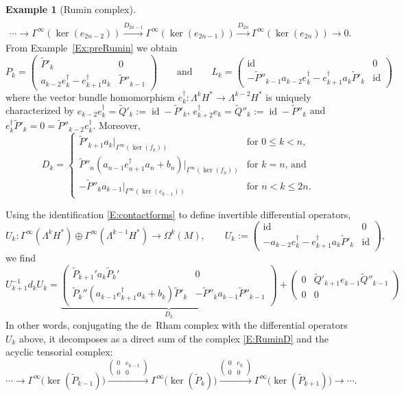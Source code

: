 \documentclass[reqno,12pt]{amsart}
\DeclareMathOperator{\id}{id}
\theoremstyle{plain}
\theoremstyle{definition}
\newtheorem{example}[theorem]{Example}
\begin{document}
\begin{example}[Rumin complex]
\begin{multline}
\\
\cdots\to\Gamma^\infty(\ker(e_{2n-2}))\xrightarrow{D_{2n-1}}
\Gamma^\infty(\ker(e_{2n-1}))\xrightarrow{D_{2n}}
\Gamma^\infty(\ker(e_{2n}))\to0.
\end{multline}
From Example~\ref{Ex:preRumin} we obtain
$$
P_k=\begin{pmatrix}\tilde P'_k&0\\a_{k-2}e^\dag_k-e^\dag_{k+1}a_k&\tilde P''_{k-1}\end{pmatrix}\qquad\text{and}\qquad
L_k=\begin{pmatrix}\id&0\\-\tilde P''_{k-1}a_{k-2}e^\dag_k-e^\dag_{k+1}a_k\tilde P'_k&\id\end{pmatrix}
$$
where the vector bundle homomorphism $e_k^\dag\colon\Lambda^kH^*\to\Lambda^{k-2}H^*$ is uniquely characterized by $e_{k-2}e^\dag_k=\tilde Q'_k:=\id-\tilde P'_k$, $e^\dag_{k+2}e_k=\tilde Q''_k:=\id-\tilde P''_k$ and $e^\dag_k\tilde P'_k=0=\tilde P''_{k-2}e^\dag_k$.
Moreover,
\begin{equation}\label{E:RuminDD}
D_k=\begin{cases}
\tilde P'_{k+1}a_k|_{\Gamma^\infty(\ker(f_k))}&\text{for $0\leq k<n$,}
\\
\tilde P''_n(a_{n-1}e^\dag_{n+1}a_n+b_n)|_{\Gamma^\infty(\ker(f_n))}&\text{for $k=n$, and}
\\
-\tilde P''_ka_{k-1}|_{\Gamma^\infty(\ker(e_{k-1}))}&\text{for $n<k\leq2n$.}
\end{cases}
\end{equation}

Using the identification \eqref{E:contactforms} to define invertible differential operators, 
$$
U_k\colon\Gamma^\infty(\Lambda^kH^*)\oplus\Gamma^\infty(\Lambda^{k-1}H^*)\to\Omega^k(M),\qquad
U_k:=\begin{pmatrix}\id&0\\-a_{k-2}e^\dag_k-e^\dag_{k+1}a_k\tilde P'_k&\id\end{pmatrix},
$$
we find
$$
U_{k+1}^{-1}d_kU_k=\underbrace{\begin{pmatrix}\tilde P_{k+1}'a_k\tilde P_k'&0\\\tilde P_k''(a_{k-1}e^\dag_{k+1}a_k+b_k)\tilde P'_k&-\tilde P''_ka_{k-1}\tilde P''_{k-1}\end{pmatrix}}_{D_k}
+\begin{pmatrix}0&\tilde Q'_{k+1}e_{k-1}\tilde Q''_{k-1}\\0&0\end{pmatrix}
$$
In other words, conjugating the de~Rham complex with the differential operators $U_k$ above, it decomposes as a direct sum of the complex \eqref{E:RuminD} and the acyclic tensorial complex:
$$
\cdots\to\Gamma^\infty\bigl(\ker(\tilde P_{k-1})\bigr)
\xrightarrow{\begin{pmatrix}0&e_{k-1}\\0&0\end{pmatrix}}
\Gamma^\infty\bigl(\ker(\tilde P_k)\bigr)
\xrightarrow{\begin{pmatrix}0&e_k\\0&0\end{pmatrix}}
\Gamma^\infty\bigl(\ker(\tilde P_{k+1})\bigr)
\to\cdots.
$$



\end{example}
\end{document}
